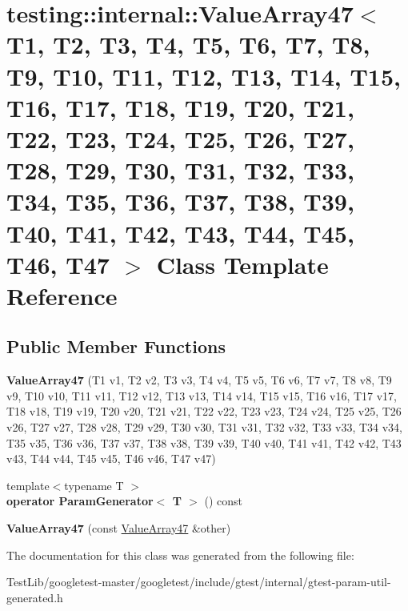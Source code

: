 \hypertarget{classtesting_1_1internal_1_1ValueArray47}{}\section{testing\+:\+:internal\+:\+:Value\+Array47$<$ T1, T2, T3, T4, T5, T6, T7, T8, T9, T10, T11, T12, T13, T14, T15, T16, T17, T18, T19, T20, T21, T22, T23, T24, T25, T26, T27, T28, T29, T30, T31, T32, T33, T34, T35, T36, T37, T38, T39, T40, T41, T42, T43, T44, T45, T46, T47 $>$ Class Template Reference}
\label{classtesting_1_1internal_1_1ValueArray47}
\subsection*{Public Member Functions}
\begin{DoxyCompactItemize}
\item 
\mbox{\label{classtesting_1_1internal_1_1ValueArray47_aaf4258366a73eb057d5e9c8aec88ec00}} 
{\bfseries Value\+Array47} (T1 v1, T2 v2, T3 v3, T4 v4, T5 v5, T6 v6, T7 v7, T8 v8, T9 v9, T10 v10, T11 v11, T12 v12, T13 v13, T14 v14, T15 v15, T16 v16, T17 v17, T18 v18, T19 v19, T20 v20, T21 v21, T22 v22, T23 v23, T24 v24, T25 v25, T26 v26, T27 v27, T28 v28, T29 v29, T30 v30, T31 v31, T32 v32, T33 v33, T34 v34, T35 v35, T36 v36, T37 v37, T38 v38, T39 v39, T40 v40, T41 v41, T42 v42, T43 v43, T44 v44, T45 v45, T46 v46, T47 v47)
\item 
\mbox{\label{classtesting_1_1internal_1_1ValueArray47_a2ad26da97f6ade0b1ac3cbbf29c75f39}} 
{\footnotesize template$<$typename T $>$ }\\{\bfseries operator Param\+Generator$<$ T $>$} () const
\item 
\mbox{\label{classtesting_1_1internal_1_1ValueArray47_a216cbaff0ba9e32cb97254495ba2c95f}} 
{\bfseries Value\+Array47} (const \hyperlink{classtesting_1_1internal_1_1ValueArray47}{Value\+Array47} \&other)
\end{DoxyCompactItemize}


The documentation for this class was generated from the following file\+:\begin{DoxyCompactItemize}
\item 
Test\+Lib/googletest-\/master/googletest/include/gtest/internal/gtest-\/param-\/util-\/generated.\+h\end{DoxyCompactItemize}
